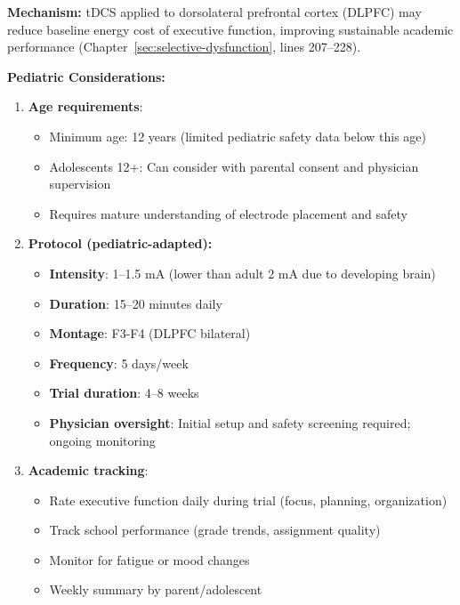 \begin{recommendation}
\label{rec:tdcs-ped-ambulatory}

\textbf{Mechanism:} tDCS applied to dorsolateral prefrontal cortex (DLPFC) may reduce baseline energy cost of executive function, improving sustainable academic performance (Chapter~\ref{sec:selective-dysfunction}, lines 207--228).

\textbf{Pediatric Considerations:}

\begin{enumerate}
    \item \textbf{Age requirements}:
    \begin{itemize}
        \item Minimum age: 12 years (limited pediatric safety data below this age)
        \item Adolescents 12+: Can consider with parental consent and physician supervision
        \item Requires mature understanding of electrode placement and safety
    \end{itemize}

    \item \textbf{Protocol (pediatric-adapted):}
    \begin{itemize}
        \item \textbf{Intensity}: 1--1.5 mA (lower than adult 2 mA due to developing brain)
        \item \textbf{Duration}: 15--20 minutes daily
        \item \textbf{Montage}: F3-F4 (DLPFC bilateral)
        \item \textbf{Frequency}: 5 days/week
        \item \textbf{Trial duration}: 4--8 weeks
        \item \textbf{Physician oversight}: Initial setup and safety screening required; ongoing monitoring
    \end{itemize}

    \item \textbf{Academic tracking}:
    \begin{itemize}
        \item Rate executive function daily during trial (focus, planning, organization)
        \item Track school performance (grade trends, assignment quality)
        \item Monitor for fatigue or mood changes
        \item Weekly summary by parent/adolescent
    \end{itemize}


\end{enumerate}
\end{recommendation}
